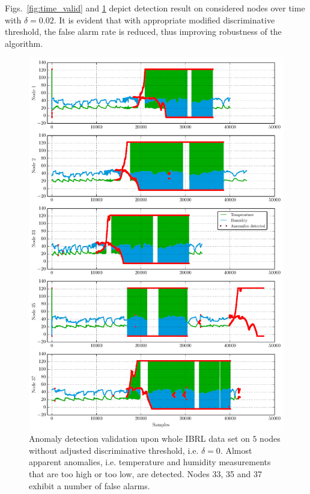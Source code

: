 \documentclass[conference]{IEEEtran}
\begin{document}
Figs.~\ref{fig:time_valid} and \ref{fig:time_valid0} depict detection result on considered nodes over time with $\delta=0.02$. It is evident that with appropriate modified discriminative threshold, the false alarm rate is reduced, thus improving robustness of the algorithm.
\begin{figure}
\centering
\includegraphics[scale=.7]{Python/time_validation0.pdf}
\caption{Anomaly detection validation upon whole IBRL data set on $5$ nodes without adjusted discriminative threshold, i.e. $\delta=0$. Almost apparent anomalies, i.e. temperature and humidity measurements that are too high or too low, are detected. Nodes 33, 35 and 37 exhibit a number of false alarms.}
\label{fig:time_valid0}
\end{figure}
\end{document}
